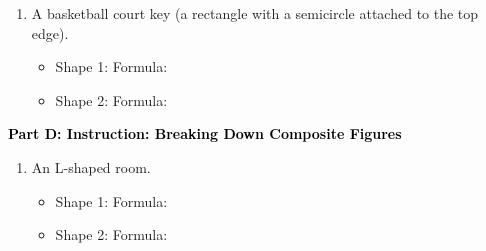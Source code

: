 \documentclass[12pt, letterpaper, fleqn]{article}
\newcommand{\blank}{\underline{\hspace{2.2cm}}}
\newcommand{\blanklong}{\underline{\hspace{6.5cm}}}
\begin{document}
\vspace{3mm}

\begin{enumerate}[itemsep=2.2cm, leftmargin=0.6cm, resume]
\item A basketball court key (a rectangle with a semicircle attached to the top edge).
\begin{itemize}
\item Shape 1: \blanklong Formula: \blank
\item Shape 2: \blanklong Formula: \blank
\end{itemize}
\end{enumerate}

\newpage

\begin{tcolorbox}[colback=customteal!20]
\large\textcolor{black}{\textbf{Part D: Instruction: Breaking Down Composite Figures}}
\end{tcolorbox}

\vspace{3mm}

\begin{enumerate}[itemsep=2.2cm, leftmargin=0.6cm, resume]
\item An L-shaped room.
\begin{itemize}
\item Shape 1: \blanklong Formula: \blank
\item Shape 2: \blanklong Formula: \blank
\end{itemize}
\end{enumerate}
\end{document}
